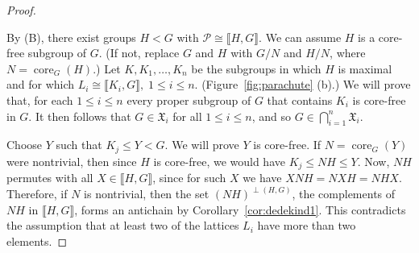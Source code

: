 \documentclass{gen-j-l}
\newcommand{\lb}{\ensuremath{\llbracket}}
\newcommand{\rb}{\ensuremath{\rrbracket}}
\newcommand{\<}{\ensuremath{\langle}}
\renewcommand{\>}{\ensuremath{\rangle}}
\theoremstyle{plain}
\theoremstyle{definition}
\theoremstyle{remark}
\numberwithin{theorem}{section}
\numberwithin{claim}{section}
\numberwithin{equation}{section}
\numberwithin{conjecture}{section}
\renewcommand{\leq}{\ensuremath{\leqslant}}
\newcommand{\core}{\ensuremath{\operatorname{core}}}
\newcommand{\2}{\ensuremath{\mathbf{2}}}
\newcommand{\3}{\ensuremath{\mathbf{3}}}
\newcommand{\sG}{\ensuremath{\mathfrak{X}}}
\newcommand{\sP}{\ensuremath{\mathscr{P}}}
\begin{document}
\begin{proof}
\begin{figure}[centering]
\begin{center}
{
}
\end{center}
\end{figure}
By (B), there exist groups $H <G$ with $\sP \cong \lb H,G \rb$.  We can assume $H$
is a core-free subgroup of $G$.  (If not, replace $G$ and $H$ with
$G/N$ and $H/N$, where $N=\core_G(H)$.)
Let $K, K_1, \dots, K_n$ be the subgroups in which $H$ is maximal
and for which $L_i \cong \lb K_i, G \rb,\; 1\leq i\leq n$. 
(Figure~\ref{fig:parachute} (b).)
We will prove that, for each $1\leq i\leq n$ every proper subgroup of 
$G$ that contains $K_i$ is core-free in $G$.
It then follows that $G\in \sG_i$ for all 
$1\leq i \leq n$, and so $G \in \bigcap\limits_{i=1}^n \sG_i$. 

Choose $Y$ such that $K_j \leq Y < G$.  We will prove $Y$ is core-free.
If $N = \core_G(Y)$ were nontrivial, then since $H$ is core-free,
we would have $K_j \leq NH \leq Y$.  Now, $NH$ permutes with all $X \in
\lb H, G\rb$, since for such $X$ we have $X NH = NX H = NHX$.  Therefore, 
if $N$ is nontrivial, then the set $(NH)^{\perp(H,G)}$, the
complements of $NH$ in $\lb H, G\rb$, forms an antichain by
Corollary~\ref{cor:dedekind1}. This contradicts the assumption that at least
two of the lattices $L_i$ have more than two elements.
\end{proof}
\end{document}
